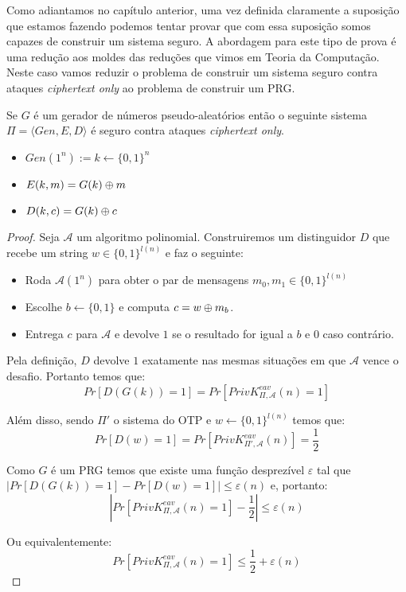 Como adiantamos no capítulo anterior, uma vez definida claramente a suposição que estamos fazendo podemos tentar provar que com essa suposição somos capazes de construir um sistema seguro.
A abordagem para este tipo de prova é uma redução aos moldes das reduções que vimos em Teoria da Computação.
Neste caso vamos reduzir o problema de construir um sistema seguro contra ataques {\em ciphertext only} ao problema de construir um PRG.


\begin{theorem}
  Se $G$ é um gerador de números pseudo-aleatórios então o seguinte sistema $\Pi = \langle Gen, E, D \rangle$ é seguro contra ataques {\em ciphertext only}.
\begin{itemize}
\item $Gen(1^n) := k \leftarrow \{0,1\}^n$
\item $E(k,m) = G(k) \oplus m$
\item $D(k,c) = G(k) \oplus c$
\end{itemize}
\end{theorem}
\begin{proof}
Seja $\mathcal{A}$ um algoritmo polinomial.
Construiremos um distinguidor $D$ que recebe um string $w \in \{0,1\}^{l(n)}$ e faz o seguinte:
\begin{itemize}
\item Roda $\mathcal{A}(1^n)$ para obter o par de mensagens $m_0, m_1 \in \{0,1\}^{l(n)}$
\item Escolhe $b \leftarrow \{0,1\}$ e computa $c = w \oplus m_b$.
\item Entrega $c$ para $\mathcal{A}$ e devolve $1$ se o resultado for igual a $b$ e $0$ caso contrário.
\end{itemize}

Pela definição, $D$ devolve $1$ exatamente nas mesmas situações em que $\mathcal{A}$ vence o desafio.
Portanto temos que:
\begin{displaymath}
Pr[D(G(k)) = 1] = Pr[PrivK^{eav}_{\Pi, \mathcal{A}}(n) = 1]  
\end{displaymath}

Além disso, sendo $\Pi'$ o sistema do OTP e $w \leftarrow \{0,1\}^{l(n)}$ temos que:
\begin{displaymath}
Pr[D(w) = 1] = Pr[PrivK^{eav}_{\Pi', \mathcal{A}}(n)] = \frac{1}{2}  
\end{displaymath}
 
Como $G$ é um PRG temos que existe uma função desprezível $\varepsilon$ tal que $|Pr[D(G(k)) = 1] - Pr[D(w) = 1]| \leq \varepsilon(n)$ e, portanto:
\begin{displaymath}
  |Pr[PrivK^{eav}_{\Pi, \mathcal{A}}(n) = 1] - \frac{1}{2}| \leq \varepsilon(n)
\end{displaymath}

Ou equivalentemente: 
\begin{displaymath}
   Pr[PrivK^{eav}_{\Pi, \mathcal{A}}(n) = 1] \leq \frac{1}{2} + \varepsilon(n)
\end{displaymath}
\end{proof}

